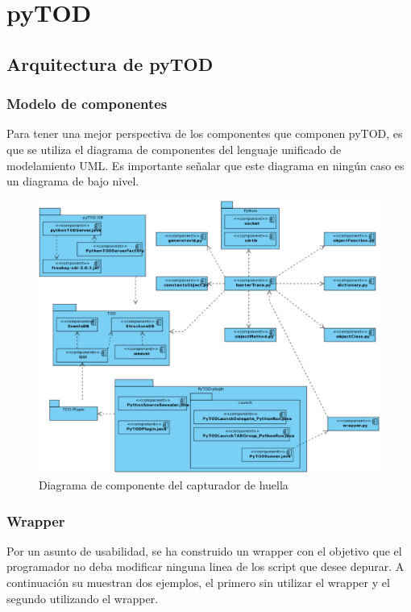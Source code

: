 \documentclass[12pt,legalpaper]{report}
\begin{document}
\chapter{pyTOD}
	\section{Arquitectura de pyTOD}
		\subsection{Modelo de componentes}

Para tener una mejor perspectiva de los componentes que componen pyTOD, es que se utiliza el diagrama de componentes del lenguaje unificado de modelamiento UML.  Es importante señalar que este diagrama en ningún caso es un diagrama de bajo nivel.		
\begin{figure}[hpb]
	\centering
	\includegraphics[scale=0.5]{images/componentModelHunterTrace.eps}
	\caption{Diagrama de componente del capturador de huella}
\end{figure}	
		
		
		\subsection{Wrapper}
		
Por un asunto de usabilidad, se ha construido un wrapper con el objetivo que el programador no deba modificar ninguna linea de los script que desee depurar.  A continuación su muestran dos ejemplos, el primero sin utilizar el wrapper y el segundo utilizando el wrapper.
\end{document}
